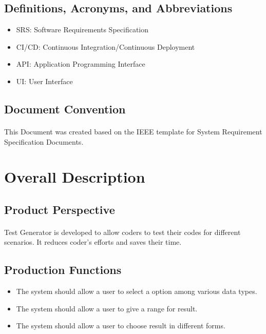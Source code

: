 \documentclass{article}
\begin{document}
\subsection{Definitions, Acronyms, and Abbreviations}
\begin{itemize}
    \item SRS: Software Requirements Specification
    \item CI/CD: Continuous Integration/Continuous Deployment
    \item API: Application Programming Interface
    \item UI: User Interface
\end{itemize}

\subsection{Document Convention}
\paragraph{}
This Document was created based on the IEEE template for System Requirement Specification
Documents.

\section{Overall Description}
\subsection{Product Perspective}
\paragraph{}
Test Generator is developed to allow coders to test their codes for different scenarios. It reduces coder's efforts and saves their time.

\subsection{Production Functions}
\begin{itemize}
    \item The system should allow a user to select a option among various data types.
    \item The system should allow a user to give a range for result.
    \item The system should allow a user to choose result in different forms.
\end{itemize}
\end{document}
